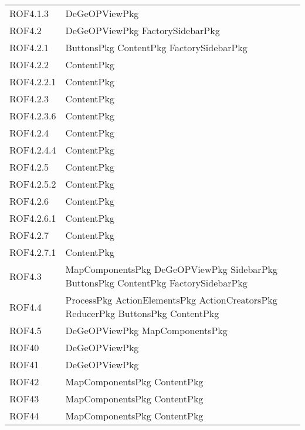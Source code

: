 \begin{longtable}{p{2.5cm}!{\VRule[1pt]}p{5cm}}
		ROF4.1.3 & DeGeOPViewPkg\\
		ROF4.2 & DeGeOPViewPkg \newline FactorySidebarPkg\\
		ROF4.2.1 & ButtonsPkg \newline ContentPkg \newline FactorySidebarPkg\\
		ROF4.2.2 & ContentPkg\\
		ROF4.2.2.1 & ContentPkg\\
		ROF4.2.3 & ContentPkg\\
		ROF4.2.3.6 & ContentPkg\\
		ROF4.2.4 & ContentPkg\\
		ROF4.2.4.4 & ContentPkg\\
		ROF4.2.5 & ContentPkg\\
		ROF4.2.5.2 & ContentPkg\\
		ROF4.2.6 & ContentPkg\\
		ROF4.2.6.1 & ContentPkg\\
		ROF4.2.7 & ContentPkg\\
		ROF4.2.7.1 & ContentPkg\\
		ROF4.3 & MapComponentsPkg \newline DeGeOPViewPkg \newline SidebarPkg \newline ButtonsPkg \newline ContentPkg \newline FactorySidebarPkg\\
		ROF4.4 & ProcessPkg \newline ActionElementsPkg \newline ActionCreatorsPkg \newline ReducerPkg \newline ButtonsPkg \newline ContentPkg\\
		ROF4.5 & DeGeOPViewPkg \newline MapComponentsPkg\\
		ROF40 & DeGeOPViewPkg\\
		ROF41 & DeGeOPViewPkg\\
		ROF42 & MapComponentsPkg \newline ContentPkg\\
		ROF43 & MapComponentsPkg \newline ContentPkg\\
		ROF44 & MapComponentsPkg \newline ContentPkg\\

\end{longtable}
